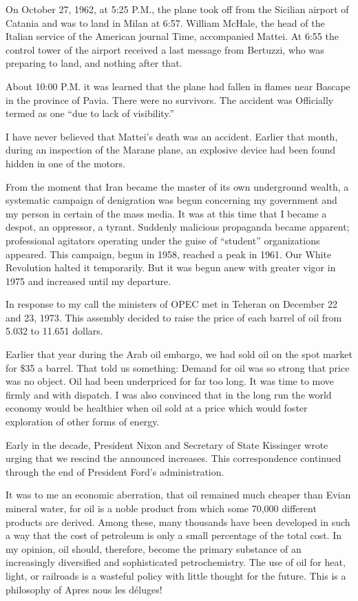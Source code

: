 On October 27, 1962, at 5:25 P.M., the plane took off from the Sicilian airport of Catania and was to land in Milan at 6:57. William McHale, the head of the Italian service of the American journal Time, accompanied Mattei. At 6:55 the control tower of the airport received a last message from Bertuzzi, who was preparing to land, and nothing after that. 


About 10:00 P.M. it was learned that the plane had fallen in flames near Bascape in the province of Pavia. There were no survivors. The accident was Officially termed as one “due to lack of visibility.” 

I have never believed that Mattei's death was an accident. Earlier that month, during an inspection of the Marane plane, an explosive device had been found hidden in one of the motors. 

From the moment that Iran became the master of its own underground wealth, a systematic campaign of denigration was begun concerning my government and my person in certain of the mass media. It was at this time that I became a despot, an oppressor, a tyrant. Suddenly malicious propaganda became apparent; professional agitators operating under the guise of “student” organizations appeared. This campaign, begun in 1958, reached a peak in 1961. Our White Revolution halted it temporarily. But it was begun anew with greater vigor in 1975 and increased until my departure. 

In response to my call the ministers of OPEC met in Teheran on December 22 and 23, 1973. This assembly decided to raise the price of each barrel of oil from 5.032 to 11.651 dollars. 

Earlier that year during the Arab oil embargo, we had sold oil on the spot market for \$35 a barrel. That told us something: Demand for oil was so strong that price was no object. Oil had been underpriced for far too long. It was time to move firmly and with dispatch. I was also convinced that in the long run the world economy would be healthier when oil sold at a price which would foster exploration of other forms of energy. 

Early in the decade, President Nixon and Secretary of State Kissinger wrote urging that we rescind the announced increases. This correspondence continued through the end of President Ford's administration. 

It was to me an economic aberration, that oil remained much cheaper than Evian mineral water, for oil is a noble product from which some 70,000 different products are derived. Among these, many thousands have been developed in such a way that the cost of petroleum is only a small percentage of the total cost. In my opinion, oil should, therefore, become the primary substance of an increasingly diversified and sophisticated petrochemistry. The use of oil for heat, light, or railroads is a wasteful policy with little thought for the future. This is a philosophy of Apres nous les déluges! 

